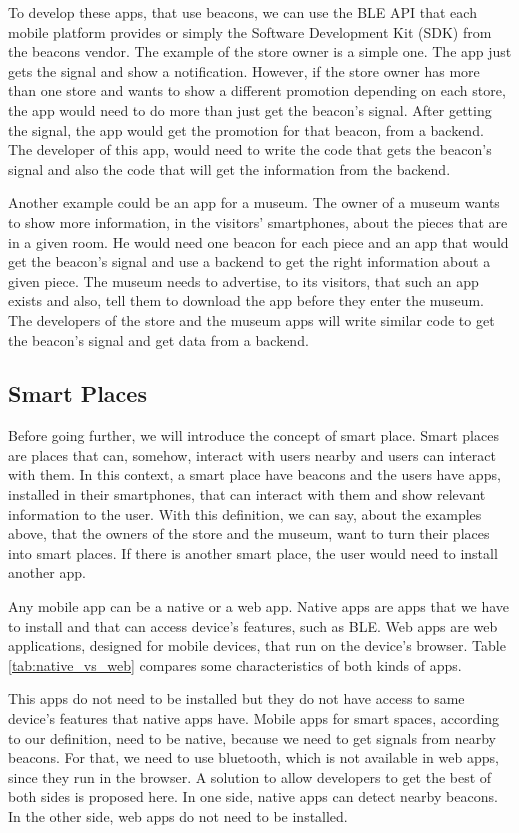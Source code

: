 To develop these apps, that use beacons, we can use the 
BLE API that each 
mobile platform provides or simply the Software
Development Kit (SDK) from the 
beacons vendor. The example of the store owner is a
simple one. The app just gets the signal and show a 
notification. However, if the store owner has more than
one store and wants to show a different promotion depending
on each store, the app would need to do more than just get
the beacon's signal. After getting the signal, the app
would get the promotion for that beacon, from a 
backend. The developer of this app, would need to
write the code that gets the beacon's signal and also
the code that will get the information from the backend.

Another example could be an app for a museum. The owner
of a museum wants to show more information, in the 
visitors' smartphones, about the pieces that are in a given
room. He would need one beacon for each piece and an app
that would get the beacon's signal and use a
backend to get the right information about a given piece.
The museum needs to advertise, to its visitors, that such
an app exists and also, tell them to download the app
before they enter the museum. The developers of the
store and the museum apps will write similar code to get
the beacon's signal and get data from a backend.

\subsection{Smart Places}
\label{sub:smart_places}
Before going further, we will introduce the concept of
smart place. Smart places are places that can, somehow,
interact with users nearby and users can interact 
with them.
In this context, a smart place have beacons and the users
have apps, installed in their smartphones, that can interact
with them and show relevant information to the user.
With this definition, we can say, about the examples above,
that the owners of the store and the museum, want to
turn their places into smart places.
If there is another smart place, the user would need to
install another app.

Any mobile app can be a native or a web app. Native apps
are apps that we have to install and that can access
device's features, such as BLE. Web apps are web
applications, designed for mobile devices, that run
on the device's browser. Table \ref{tab:native_vs_web}
compares some characteristics of both kinds of apps.

This apps do not need to be
installed but they do not have access
to same device's features that native apps have.
Mobile apps for smart spaces, according to our definition,
need to be native, because we need to get signals from
nearby beacons. For that, we need to use bluetooth, which is
not available in web apps, since they run in the browser.
A solution to allow developers to get the best of both sides
is proposed here. In one side,
native apps can detect nearby beacons. In the other side,
web apps do not need to be installed.

